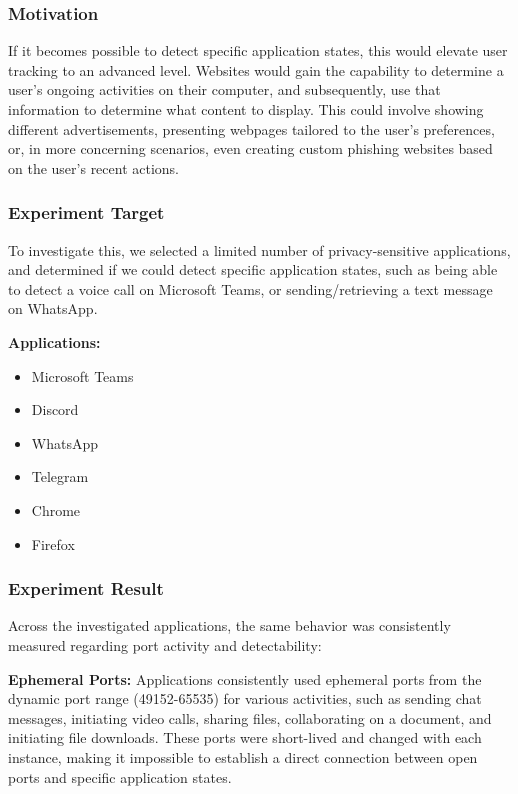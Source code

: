 \subsubsection{Motivation}

If it becomes possible to detect specific application states, this would elevate user tracking to an advanced level. Websites would gain the capability to determine a user's ongoing activities on their computer, and subsequently, use that information to determine what content to display. This could involve showing different advertisements, presenting webpages tailored to the user's preferences, or, in more concerning scenarios, even creating custom phishing websites based on the user's recent actions.

\subsubsection{Experiment Target}

To investigate this, we selected a limited number of privacy-sensitive applications, and determined if we could detect specific application states, 
such as being able to detect a voice call on Microsoft Teams, or sending/retrieving a text message on WhatsApp.

\textbf{Applications:}
\begin{itemize}
    \item Microsoft Teams
    \item Discord
    \item WhatsApp
    \item Telegram
    \item Chrome
    \item Firefox
\end{itemize}

\subsubsection{Experiment Result}

Across the investigated applications, the same behavior was consistently measured regarding port activity and detectability:

\textbf{Ephemeral Ports:} Applications consistently used ephemeral ports from the dynamic port range (49152-65535) for various activities, such as sending chat messages, initiating video calls, sharing files, collaborating on a document, and initiating file downloads. These ports were short-lived and changed with each instance, making it impossible to establish a direct connection between open ports and specific application states.

